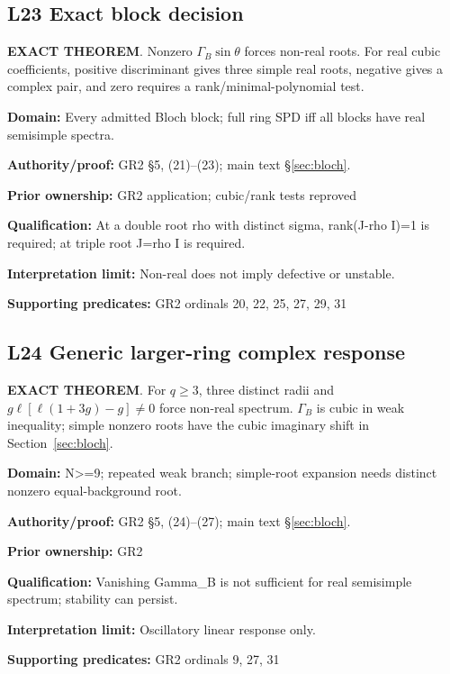 \par\noindent\begin{minipage}{\linewidth}
\subsection*{L23 Exact block decision}
\textbf{EXACT THEOREM}. Nonzero \(\Gamma_B\sin\theta\) forces non-real roots. For real cubic coefficients, positive discriminant gives three simple real roots, negative gives a complex pair, and zero requires a rank/minimal-polynomial test.\par
\textbf{Domain:} Every admitted Bloch block; full ring SPD iff all blocks have real semisimple spectra.\par
\textbf{Authority/proof:} GR2 \S{}5, (21)--(23); main text \S\ref{sec:bloch}.\par
\textbf{Prior ownership:} GR2 application; cubic/rank tests reproved\par
\textbf{Qualification:} At a double root rho with distinct sigma, rank(J-rho I)=1 is required; at triple root J=rho I is required.\par
\textbf{Interpretation limit:} Non-real does not imply defective or unstable.\par
\textbf{Supporting predicates:} GR2 ordinals 20, 22, 25, 27, 29, 31\par
\end{minipage}\par\medskip
\par\noindent\begin{minipage}{\linewidth}
\subsection*{L24 Generic larger-ring complex response}
\textbf{EXACT THEOREM}. For \(q\ge3\), three distinct radii and \(g\ell[\ell(1+3g)-g]\ne0\) force non-real spectrum. \(\Gamma_B\) is cubic in weak inequality; simple nonzero roots have the cubic imaginary shift in Section~\ref{sec:bloch}.\par
\textbf{Domain:} N>=9; repeated weak branch; simple-root expansion needs distinct nonzero equal-background root.\par
\textbf{Authority/proof:} GR2 \S{}5, (24)--(27); main text \S\ref{sec:bloch}.\par
\textbf{Prior ownership:} GR2\par
\textbf{Qualification:} Vanishing Gamma\_B is not sufficient for real semisimple spectrum; stability can persist.\par
\textbf{Interpretation limit:} Oscillatory linear response only.\par
\textbf{Supporting predicates:} GR2 ordinals 9, 27, 31\par
\end{minipage}\par\medskip
